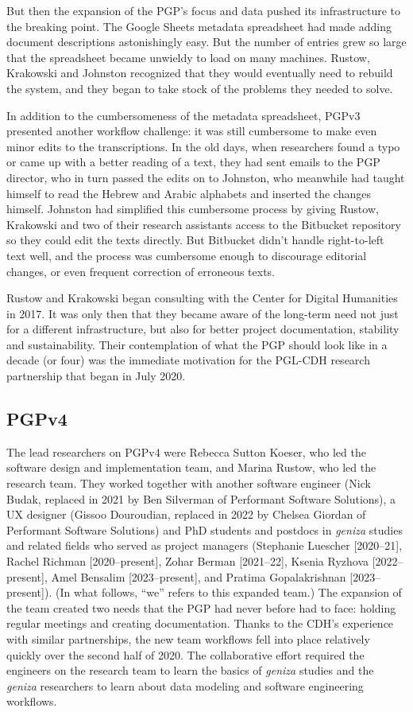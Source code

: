 \documentclass{article}
\begin{document}
But then the expansion of the PGP’s focus and data pushed its infrastructure to the breaking point. The Google Sheets metadata spreadsheet had made adding document descriptions astonishingly easy. But the number of entries grew so large that the spreadsheet became unwieldy to load on many machines. Rustow, Krakowski and Johnston recognized that they would eventually need to rebuild the system, and they began to take stock of the problems they needed to solve. 

In addition to the cumbersomeness of the metadata spreadsheet, PGPv3 presented another workflow challenge: it was still cumbersome to make even minor edits to the transcriptions. In the old days, when researchers found a typo or came up with a better reading of a text, they had sent emails to the PGP director, who in turn passed the edits on to Johnston, who meanwhile had taught himself to read the Hebrew and Arabic alphabets and inserted the changes himself. Johnston had simplified this cumbersome process by giving Rustow, Krakowski and two of their research assistants access to the Bitbucket repository so they could edit the texts directly. But Bitbucket didn’t handle right-to-left text well, and the process was cumbersome enough to discourage editorial changes, or even frequent correction of erroneous texts.  

Rustow and Krakowski began consulting with the Center for Digital Humanities in 2017. It was only then that they became aware of the long-term need not just for a different infrastructure, but also for better project documentation, stability and sustainability. Their contemplation of what the PGP should look like in a decade (or four) was the immediate motivation for the PGL-CDH research partnership that began in July 2020.

\subsection{PGPv4}

The lead researchers on PGPv4 were Rebecca Sutton Koeser, who led the software design and implementation team, and Marina Rustow, who led the research team. They worked together with another software engineer (Nick Budak, replaced in 2021 by Ben Silverman of Performant Software Solutions), a UX designer (Gissoo Douroudian, replaced in 2022 by Chelsea Giordan of Performant Software Solutions) and PhD students and postdocs in \textit{geniza} studies and related fields who served as project managers (Stephanie Luescher [2020–21], Rachel Richman [2020–present], Zohar Berman [2021–22], Ksenia Ryzhova [2022–present], Amel Bensalim [2023–present], and Pratima Gopalakrishnan [2023–present]). (In what follows, “we” refers to this expanded team.) The expansion of the team created two needs that the PGP had never before had to face: holding regular meetings and creating documentation. Thanks to the CDH’s experience with similar partnerships, the new team workflows fell into place relatively quickly over the second half of 2020. The collaborative effort required the engineers on the research team to learn the basics of \textit{geniza} studies and the \textit{geniza} researchers to learn about data modeling and software engineering workflows.
\end{document}

